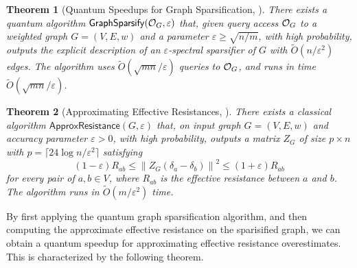 \documentclass[11pt]{article}
\newtheorem{theorem}{Theorem} \newtheorem{lemma}[theorem]{Lemma} \newtheorem{proposition}[theorem]{Proposition} \newtheorem{corollary}[theorem]{Corollary} \newtheorem{definition}[theorem]{Definition} \newtheorem{conjecture}[theorem]{Conjecture} \newtheorem{claim}[theorem]{Claim} \newtheorem{fact}[theorem]{Fact}
\newcommand{\norm}[1]{\left\lVert #1 \right\rVert}
\newcommand{\ceils}[1]{\lceil #1 \rceil}
\newcommand{\paren}[1]{\left( #1 \right)}
\newcommand{\parens}[1]{( #1 )}
\begin{document}
{\begin{theorem}[Quantum Speedups for Graph Sparsification, {\cite[Theorem 1.1]{AdW22}}]\label{thm:apers-spectral-sparse-appendix}
  There exists a quantum algorithm $\mathsf{GraphSparsify}(\mathcal{O} _G, \varepsilon)$
  that, given query access $\mathcal{O} _G$ to a weighted graph $G=\paren{V,E,w}$ and a parameter $\varepsilon\geq \sqrt{n/m}$,
  with high probability, outputs the explicit description of an
  $\varepsilon$-spectral sparsifier of $G$ with
  $\tilde O\parens {n/\varepsilon^2}$ edges. The algorithm uses
  $\tilde{O} (\sqrt{mn}/\varepsilon)$ queries to $\mathcal{O}_{G}$, and runs in time
  $\tilde O\parens{ \sqrt{mn}/\varepsilon}$.
\end{theorem}

 \begin{theorem}[Approximating Effective Resistances, {\cite[Theorem 2]{SS11}}]\label{thm:approximate-resistance-compute}
     There exists a classical algorithm
     $\mathsf{ApproxResistance}(G, \varepsilon)$
      that, on input graph $G= \parens{V, E, w}$ and accuracy parameter $\varepsilon > 0$,
     with high probability,
     outputs a matrix $Z_G$ of size $p \times n $ with $p= \ceils{24\log n /\varepsilon^2}$ satisfying
     \begin{equation*}
 		\parens{1-\varepsilon}R _{ab  }\leq \norm{ Z_G \parens{\delta_a -\delta_b }}^2 \leq
 		\parens{1+\varepsilon}R_ {ab }
     \end{equation*}
     for every pair of  $a, b\in V$,
     where $R_{ab}$ is the effective resistance between $a$ and $b$.
     The algorithm runs
     in $\widetilde O\parens{m /\varepsilon^2}$ time.
 \end{theorem}

 By first applying the quantum graph sparsification algorithm,
 and then computing the approximate effective resistance on
 the sparisified graph,
 we can obtain a quantum speedup for
 approximating effective resistance overestimates.
 This is characterized by the following theorem.

}
\end{document}
